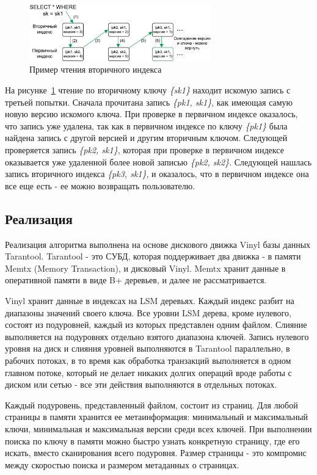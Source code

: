 \documentclass[a4paper,hidelinks,12pt]{article}
\begin{document}
\begin{figure}
\centering
\includegraphics[width=0.7\textwidth]{secondary_reading_example}
\caption{Пример чтения вторичного индекса}
\label{fig:secondary_reading_example}
\end{figure}

На рисунке~\ref{fig:secondary_reading_example} чтение по вторичному ключу
\textit{\{sk1\}} находит искомую запись с третьей попытки. Сначала прочитана
запись \textit{\{pk1, sk1\}}, как имеющая самую новую версию искомого ключа.
При проверке в первичном индексе оказалось, что запись уже удалена, так как в
первичном индексе по ключу \textit{\{pk1\}} была найдена запись с другой версией
и другим вторичным ключом. Следующей проверяется запись \textit{\{pk2, sk1\}},
которая при проверке в первичном индексе оказывается уже удаленной более новой
записью \textit{\{pk2, sk2\}}. Следующей нашлась запись вторичного индекса
\textit{\{pk3, sk1\}}, и оказалось, что в первичном индексе она все еще есть -
ее можно возвращать пользователю.

\subsection{Реализация}
Реализация алгоритма выполнена на основе дискового движка Vinyl базы данных
Tarantool. Tarantool - это СУБД, которая поддерживает два движка - в памяти
Memtx (Memory Transaction), и дисковый Vinyl. Memtx хранит данные в оперативной
памяти в виде B+ деревьев, и далее не рассматривается.

Vinyl хранит данные в индексах на LSM деревьях. Каждый индекс разбит на
диапазоны значений своего ключа. Все уровни LSM дерева, кроме нулевого, состоят
из подуровней, каждый из которых представлен одним файлом. Слияние выполняется
на подуровнях отдельно взятого диапазона ключей. Запись нулевого уровня на диск
и слияния уровней выполняются в Tarantool параллельно, в рабочих потоках, в то
время как обработка транзакций выполняется в одном главном потоке, который не
делает никаких долгих операций вроде работы с диском или сетью - все эти
действия выполняются в отдельных потоках.

Каждый подуровень, представленный файлом, состоит из страниц. Для любой страницы
в памяти хранится ее метаинформация: минимальный и максимальный ключи,
минимальная и максимальная версии среди всех ключей. При выполнении поиска по
ключу в памяти можно быстро узнать конкретную страницу, где его искать, вместо
сканирования всего подуровня. Размер страницы - это компромис между скоростью
поиска и размером метаданных о страницах.
\end{document}
